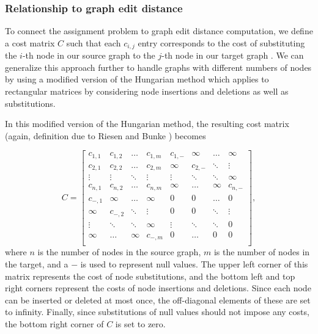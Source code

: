 \documentclass[12pt]{thesis}
\theoremstyle{plain}
\theoremstyle{definition}
\theoremstyle{remark}
\begin{document}
\subsubsection{Relationship to graph edit distance}

To connect the assignment problem to graph edit distance computation, we define a cost matrix $C$ such that each $c_{i,j}$ entry corresponds to the cost of substituting the $i$-th node in our source graph to the $j$-th node in our target graph \cite{Riesen_2009}. We can generalize this approach further to handle graphs with different numbers of nodes by using a modified version of the Hungarian method which applies to rectangular matrices \cite{bourgeois1971extension} by considering node insertions and deletions as well as substitutions. 

In this modified version of the Hungarian method, the resulting cost matrix (again, definition due to Riesen and Bunke \cite{Riesen_2009}) becomes 

\[
C = \left[
\begin{array}{cccc|cccc}
c_{1,1} & c_{1,2} & \dots & c_{1,m}     &     c_{1,-} & \infty & \dots & \infty \\
c_{2,1} & c_{2,2} & \dots & c_{2,m}     &     \infty & c_{2,-} & \ddots & \vdots \\
\vdots & \vdots & \ddots & \vdots          &     \vdots & \ddots & \ddots & \infty \\ 
c_{n,1} & c_{n,2} & \dots & c_{n,m}     &     \infty & \dots & \infty & c_{n,-} \\ \hline

c_{-,1} & \infty & \dots & \infty             &     0 & 0 & \dots & 0 \\ 
\infty & c_{-,2} & \ddots & \vdots          &     0 & 0 & \ddots & \vdots \\ 
\vdots & \ddots & \ddots & \infty           &     \vdots & \ddots & \ddots & 0\\ 
\infty & \dots & \infty & c_{-,m}            &    0 & \dots & 0 & 0 \\ 
\end{array}
\right],
\]
where $n$ is the number of nodes in the source graph, $m$ is the number of nodes in the target, and a $-$ is used to represent null values. The upper left corner of this matrix represents the cost of node substitutions, and the bottom left and top right corners represent the costs of node insertions and deletions. Since each node can be inserted or deleted at most once, the off-diagonal elements of these are set to infinity. Finally, since substitutions of null values should not impose any costs, the bottom right corner of $C$ is set to zero.
\end{document}
